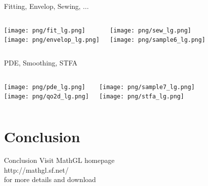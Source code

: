 \documentclass[color=usenames]{beamer}
\begin{document}
\begin{frame}{Fitting, Envelop, Sewing, ...}
\begin{columns}
\texttt{[image: png/fit\_lg.png]}\\
\texttt{[image: png/envelop\_lg.png]}

\texttt{[image: png/sew\_lg.png]}\\
\texttt{[image: png/sample6\_lg.png]}

\end{columns}
\end{frame}

\begin{frame}{PDE, Smoothing, STFA}
\begin{columns}
\texttt{[image: png/pde\_lg.png]}\\
\texttt{[image: png/qo2d\_lg.png]}

\texttt{[image: png/sample7\_lg.png]}\\
\texttt{[image: png/stfa\_lg.png]}

\end{columns}
\end{frame}

\section{Conclusion}
\begin{frame}{Conclusion}
\LARGE
Visit MathGL homepage\\[18pt]

http://mathgl.sf.net/\\[18pt]

for more details and download
\end{frame}
\end{document}
